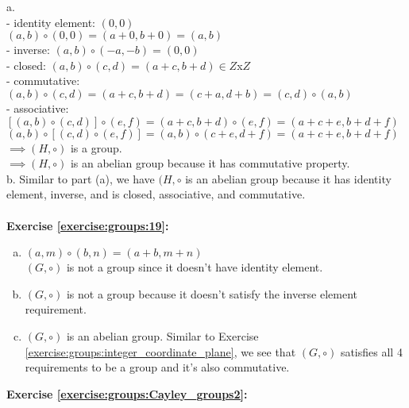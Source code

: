 a.\\
- identity element: $(0,0)$\\
$(a,b)\circ (0,0)=(a+0,b+0)=(a,b)$\\
- inverse: $(a,b)\circ (-a,-b)=(0,0)$\\
- closed: $(a,b)\circ (c,d)=(a+c,b+d)\in Z$x$Z$\\
- commutative: $(a,b)\circ (c,d)=(a+c,b+d)=(c+a,d+b)=(c,d)\circ (a,b)$\\
- associative:\\
$[(a,b)\circ (c,d)]\circ (e,f)=(a+c,b+d)\circ (e,f)=(a+c+e,b+d+f)$\\
$(a,b)\circ[(c,d)\circ (e,f)]=(a,b)\circ (c+e,d+f)=(a+c+e,b+d+f)$\\
$\implies (H,\circ)$ is a group.\\
$\implies (H,\circ)$ is an abelian group because it has commutative property.\\
b. Similar to part (a), we have $(H,\circ$ is an abelian group because it has identity element, inverse, and is closed, associative, and commutative.\\
\\
\textbf{Exercise \ref{exercise:groups:19}:}
\begin{enumerate}[(a)]
\item
$(a,m)\circ (b,n)=(a+b,m+n)$\\
$(G,\circ)$ is not a group since it doesn't have identity element.
\item
$(G,\circ)$ is not a group because it doesn't satisfy the inverse element requirement.
\item
$(G,\circ)$ is an abelian group. Similar to Exercise \ref{exercise:groups:integer_coordinate_plane}, we see that $(G,\circ)$ satisfies all 4 requirements to be a group and it's also commutative.
\end{enumerate}
\textbf{Exercise \ref{exercise:groups:Cayley_groups2}:}
